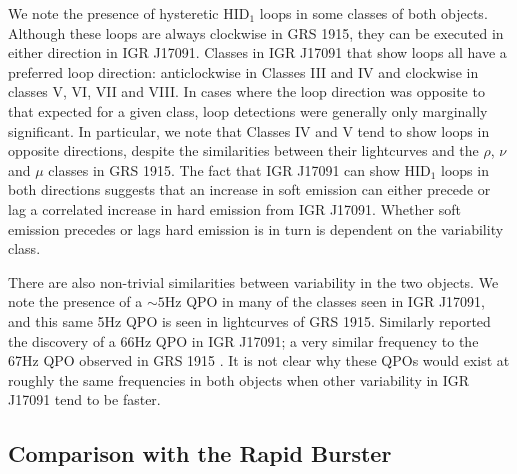 \par We note the presence of hysteretic HID$_1$ loops in some classes of both objects.  Although these loops are always clockwise in GRS 1915, they can be executed in either direction in IGR J17091.  Classes in IGR J17091 that show loops all have a preferred loop direction: anticlockwise in Classes III and IV and clockwise in classes V, VI, VII and VIII.  In cases where the loop direction was opposite to that expected for a given class, loop detections were generally only marginally significant.  In particular, we note that Classes IV and V tend to show loops in opposite directions, despite the similarities between their lightcurves and the $\rho$, $\nu$ and $\mu$ classes in GRS 1915.   The fact that IGR J17091 can show HID$_1$ loops in both directions suggests that an increase in soft emission can either precede or lag a correlated increase in hard emission from IGR J17091.  Whether soft emission precedes or lags hard emission is in turn is dependent on the variability class.
\par There are also non-trivial similarities between variability in the two objects.  We note the presence of a $\sim5$Hz QPO in many of the classes seen in IGR J17091, and this same 5Hz QPO is seen in lightcurves of GRS 1915.  Similarly \citet{Altamirano_HFQPO} reported the discovery of a 66Hz QPO in IGR J17091; a very similar frequency to the 67Hz QPO observed in GRS 1915 \citep{Morgan_QPO}.  It is not clear why these QPOs would exist at roughly the same frequencies in both objects when other variability in IGR J17091 tend to be faster.

\subsection{Comparison with the Rapid Burster}

